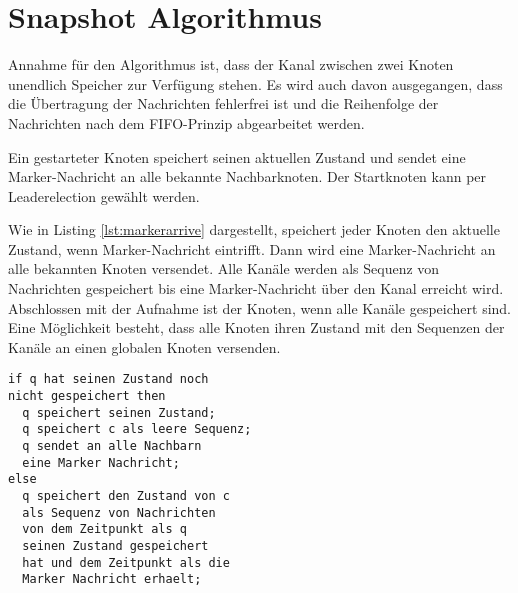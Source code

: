 \section{Snapshot Algorithmus}
\label{sec:snapshotalg}
Annahme für den Algorithmus ist, dass der Kanal zwischen zwei Knoten unendlich
Speicher zur Verfügung stehen. Es wird auch davon ausgegangen, dass die
Übertragung der Nachrichten fehlerfrei ist und die Reihenfolge der Nachrichten
nach dem FIFO-Prinzip abgearbeitet werden.

Ein gestarteter Knoten speichert seinen aktuellen Zustand und sendet eine
Marker-Nachricht an alle bekannte Nachbarknoten.  Der Startknoten kann per
Leaderelection gewählt werden.

Wie in Listing \ref{lst:markerarrive} dargestellt, speichert jeder Knoten den
aktuelle Zustand, wenn Marker-Nachricht eintrifft. Dann wird eine
Marker-Nachricht an alle bekannten Knoten versendet.  Alle Kanäle werden als
Sequenz von Nachrichten gespeichert bis eine Marker-Nachricht über den Kanal
erreicht wird. Abschlossen mit der Aufnahme ist der Knoten, wenn alle Kanäle
gespeichert sind.  Eine Möglichkeit besteht, dass alle Knoten ihren Zustand mit
den Sequenzen der Kanäle an einen globalen Knoten versenden.

\begin{lstlisting}[caption={Pseudo Ablauf, wenn Marker Nachricht über den Kanal c den Knoten q erreicht. \cite{snapshotChandyLamport}}, label=lst:markerarrive]
if q hat seinen Zustand noch
nicht gespeichert then
  q speichert seinen Zustand;
  q speichert c als leere Sequenz;
  q sendet an alle Nachbarn
  eine Marker Nachricht;
else
  q speichert den Zustand von c
  als Sequenz von Nachrichten
  von dem Zeitpunkt als q
  seinen Zustand gespeichert
  hat und dem Zeitpunkt als die
  Marker Nachricht erhaelt;
\end{lstlisting}
